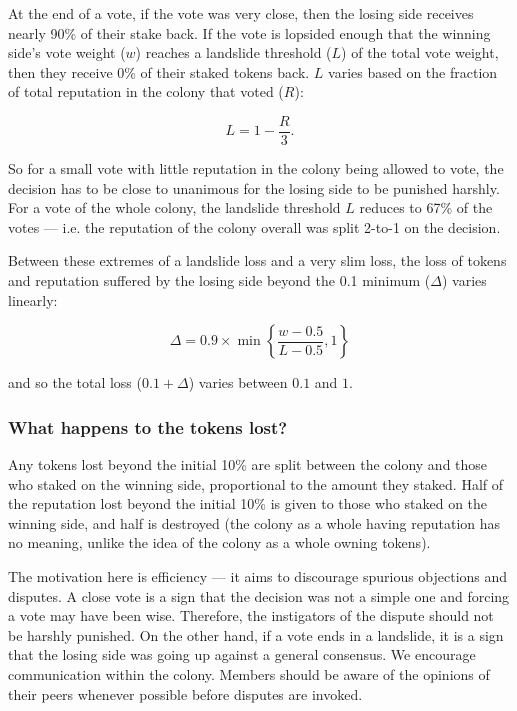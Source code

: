At the end of a vote, if the vote was very close, then the losing side receives nearly 90\% of their stake back. If the vote is lopsided enough that the winning side's vote weight ($w$) reaches a landslide threshold ($L$) of the total vote weight, then they receive 0\% of their staked tokens back. $L$ varies based on the fraction of total reputation in the colony that voted ($R$):

\begin{equation}
L = 1 - \frac{R}{3}.
\end{equation}

So for a small vote with little reputation in the colony being allowed to vote, the decision has to be close to unanimous for the losing side to be punished harshly. For a vote of the whole colony, the landslide threshold $L$ reduces to 67\% of the votes --- i.e. the reputation of the colony overall was split 2-to-1 on the decision.

Between these extremes of a landslide loss and a very slim loss, the loss of tokens and reputation suffered by the losing side beyond the 0.1 minimum ($\Delta$) varies linearly:

\begin{equation}
 \Delta = 0.9 \times \min \left\lbrace \frac{w-0.5}{L-0.5}, 1 \right\rbrace    
\end{equation}

\noindent and so the total loss ($0.1 + \Delta$) varies between $0.1$ and $1$.

\subsubsection*{What happens to the tokens lost?}
Any tokens lost beyond the initial 10\% are split between the colony and those who staked on the winning side, proportional to the amount they staked. Half of the reputation lost beyond the initial 10\% is given to those who staked on the winning side, and half is destroyed (the colony as a whole having reputation has no meaning, unlike the idea of the colony as a whole owning tokens).

The motivation here is efficiency --- it aims to discourage spurious objections and disputes. A close vote is a sign that the decision was not a simple one and forcing a vote may have been wise. Therefore, the instigators of the dispute should not be harshly punished. On the other hand, if a vote ends in a landslide, it is a sign that the losing side was going up against a general consensus. We encourage communication within the colony. Members should be aware of the opinions of their peers whenever possible before disputes are invoked.

